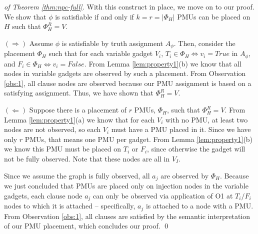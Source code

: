 \begin{proof}[of Theorem \ref{thm:npc-full}]
With this construct in place, we move on to our proof. We show that $\phi$ is satisfiable if and only if $k=r=|\Phi_H|$ PMUs
can be placed on $H$ such that $\Phi^R_{H}=V$.

$(\Rightarrow)$ Assume $\phi$ is satisfiable by truth assignment $A_{\phi}$. Then, consider the placement $\Phi_H$ such that for each variable gadget $V_i$, $T_i\in \Phi_H \Leftrightarrow v_i=True$
in $A_\phi$, and  $F_i\in \Phi_H \Leftrightarrow v_i=False$. From Lemma \ref{lem:property1}(b) we know that all nodes in variable gadgets are observed by such a placement. From Observation \ref{obs:1}, all clause nodes are observed because our PMU assignment is based on a satisfying assignment.
Thus, we have shown that $\Phi^R_{H}=V$.

$(\Leftarrow)$
Suppose there is a placement of $r$ PMUs, $\Phi_H$, such that $\Phi_H^R = V$.  From Lemma \ref{lem:property1}(a) we know that for each $V_i$ with no PMU, at least two nodes are not observed, so each $V_i$  must have a PMU placed in it. 
Since we have only $r$ PMUs, that means one PMU per gadget. From Lemma \ref{lem:property1}(b) we know this PMU must be placed on $T_i$ or $F_i$, since otherwise the gadget will not be fully observed. Note that these nodes are all in $V_I$.

Since we assume the graph is fully observed, all $a_j$ are observed by $\Phi_H$. Because we just concluded that PMUs are placed only on injection nodes in the variable gadgets, each clause node $a_j$ can only be observed via application of O1 at $T_i/F_i$ nodes to which it is attached -- specifically, $a_j$ is attached to a node with a PMU. From Observation \ref{obs:1}, all clauses are satisfied by the semantic interpretation of our PMU placement, which concludes our proof. \qed


\end{proof}



